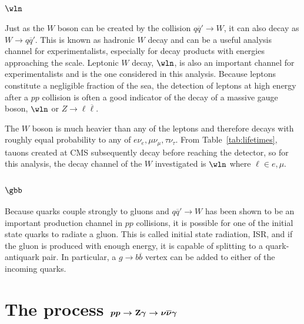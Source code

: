  \subsection[\wln]
 {$\boldsymbol{\wln}$}
  Just as the $W$ boson can be created by the
   collision $q\overline{q}'\rightarrow W$, 
   it can also decay as $W\rightarrow q\overline{q}'$.
  This is known as hadronic $W$ decay and
   can be a useful analysis channel for experimentalists,
   especially for decay products with energies approaching
   the \TeV scale.
  Leptonic $W$ decay, $\wln$, is also an important 
   channel for experimentalists and is the
   one considered in this analysis.
  Because leptons constitute a negligible fraction
   of the sea, the detection of leptons at high
   energy after a $pp$ collision is often a good 
   indicator of the decay of a massive gauge boson,
   $\wln$ or $Z\rightarrow \ell\overline{\ell}$.
  
  The $W$ boson is much heavier than any of the leptons
   and therefore decays with roughly equal probability
   to any of $e\nu_e, \mu\nu_\mu, \tau\nu_\tau$.
  From Table~\ref{tab:lifetimes}, tauons created
   at CMS
   subsequently decay before reaching the 
   detector, so for this analysis, the decay
   channel of the $W$ investigated is
   $\wln$ where $\ell\in e,\mu$.

 \subsection[\gbb]
 {$\boldsymbol{\gbb}$}
  Because quarks couple strongly to gluons
   and $q\overline{q}'\rightarrow W$ has been shown to be
   an important production channel in $pp$ collisions,
   it is possible for one of the
   initial state quarks to radiate a gluon.
  This is called initial state radiation, ISR,
   and if the gluon is produced with enough energy,
   it is capable of splitting to a quark-antiquark pair.
  In particular, a $g\rightarrow b\overline{b}$ vertex
   can be added to either of the incoming quarks.
  
%
%

\section[The process \ppzgnng]
        {The process $\boldsymbol{pp\rightarrow \mathrm{Z}\gamma\rightarrow\nu\overline{\nu}\gamma}$} \label{sec:znngproduction}

